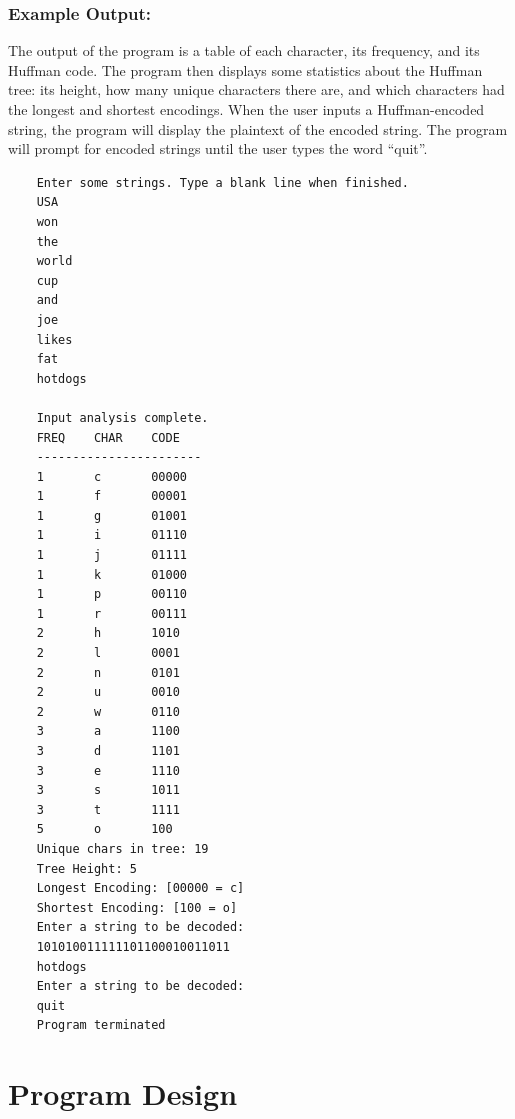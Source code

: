 	\subsubsection{Example Output:}
	The output of the program is a table of each character, its frequency, and its Huffman code. The program then displays some statistics about the Huffman tree: its height, how many unique characters there are, and which characters had the longest and shortest encodings. When the user inputs a Huffman-encoded string, the program will display the plaintext of the encoded string. The program will prompt for encoded strings until the user types the word ``quit''.
	\begin{lstlisting}
	Enter some strings. Type a blank line when finished.
	USA 
	won 
	the
	world 
	cup 
	and 
	joe 
	likes 
	fat 
	hotdogs
	
	Input analysis complete.
	FREQ    CHAR    CODE
	-----------------------
	1       c       00000
	1       f       00001
	1       g       01001
	1       i       01110
	1       j       01111
	1       k       01000
	1       p       00110
	1       r       00111
	2       h       1010
	2       l       0001
	2       n       0101
	2       u       0010
	2       w       0110
	3       a       1100
	3       d       1101
	3       e       1110
	3       s       1011
	3       t       1111
	5       o       100
	Unique chars in tree: 19
	Tree Height: 5
	Longest Encoding: [00000 = c]
	Shortest Encoding: [100 = o]
	Enter a string to be decoded:
	101010011111101100010011011
	hotdogs
	Enter a string to be decoded:
	quit
	Program terminated
	\end{lstlisting}

	\newpage
	
	\section{Program Design}
